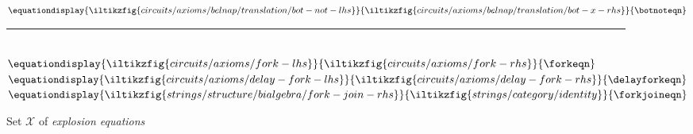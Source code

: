 \begin{figure*}
    \(\equationdisplay{
        \iltikzfig{circuits/axioms/belnap/translation/bot-not-lhs}
    }{
        \iltikzfig{circuits/axioms/belnap/translation/bot-x-rhs}
    }{
        \botnoteqn
    }\)
    \\[0.25em]
    \rule{\textwidth}{0.1mm}
    \\[0.5em]
    \(\equationdisplay{
        \iltikzfig{circuits/axioms/fork-lhs}
    }{
        \iltikzfig{circuits/axioms/fork-rhs}
    }{
        \forkeqn
    }\)
    \quad
    \(\equationdisplay{
        \iltikzfig{circuits/axioms/delay-fork-lhs}
    }{
        \iltikzfig{circuits/axioms/delay-fork-rhs}
    }{
        \delayforkeqn
    }\)
    \quad
    \(\equationdisplay{
        \iltikzfig{strings/structure/bialgebra/fork-join-rhs}
    }{
        \iltikzfig{strings/category/identity}
    }{
        \forkjoineqn
    }\)
    \\[0.5em]
    \caption{Set \(\mathcal{X}\) of \emph{explosion equations}}
    \label{fig:explosion-equations}
\end{figure*}